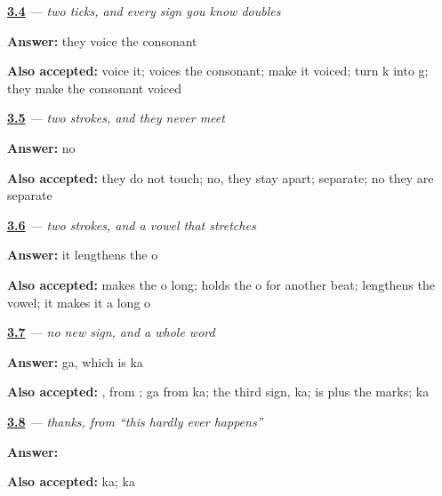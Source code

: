 \noindent\begin{minipage}[t]{\linewidth}
\raggedright
\hyperlink{review-JA-W03-dakuten-job}{\textbf{3.4}} \emph{— two ticks, and every sign you know doubles}\par
\small \textbf{Answer:} they voice the consonant\par
\footnotesize \textbf{Also accepted:} voice it; voices the consonant; make it voiced; turn k into g; they make the consonant voiced
\end{minipage}\par\medskip

\noindent\begin{minipage}[t]{\linewidth}
\raggedright
\hyperlink{review-JA-W03-to-join}{\textbf{3.5}} \emph{ — two strokes, and they never meet}\par
\small \textbf{Answer:} no\par
\footnotesize \textbf{Also accepted:} they do not touch; no, they stay apart; separate; no they are separate
\end{minipage}\par\medskip

\noindent\begin{minipage}[t]{\linewidth}
\raggedright
\hyperlink{review-JA-W03-u-long}{\textbf{3.6}} \emph{ — two strokes, and a vowel that stretches}\par
\small \textbf{Answer:} it lengthens the o\par
\footnotesize \textbf{Also accepted:} makes the o long; holds the o for another beat; lengthens the vowel; it makes it a long o
\end{minipage}\par\medskip

\noindent\begin{minipage}[t]{\linewidth}
\raggedright
\hyperlink{review-JA-W03-arigatou-read-ga}{\textbf{3.7}} \emph{ — no new sign, and a whole word}\par
\small \textbf{Answer:} ga, which is ka\par
\footnotesize \textbf{Also accepted:} , from ; ga from ka; the third sign, ka;  is  plus the marks; ka
\end{minipage}\par\medskip

\noindent\begin{minipage}[t]{\linewidth}
\raggedright
\hyperlink{review-JA-C01-arigatou-dakuten}{\textbf{3.8}} \emph{ — thanks, from “this hardly ever happens”}\par
\small \textbf{Answer:} \par
\footnotesize \textbf{Also accepted:} ka;  ka
\end{minipage}\par\medskip

